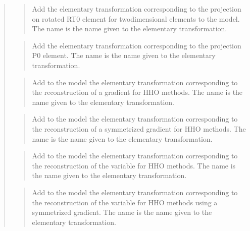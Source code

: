 \documentclass[a4paper,11pt,english]{sphinxmanual}
\begin{document}
\begin{quote}
\begin{quote}
Add the elementary transformation corresponding to the projection
on rotated RT0 element for two\sphinxhyphen{}dimensional elements to the model.
The name is the name given to the elementary transformation.
\end{quote}

\begin{quote}

Add the elementary transformation corresponding to the projection
P0 element.
The name is the name given to the elementary transformation.
\end{quote}

\begin{quote}

Add to the model the elementary transformation corresponding to the
reconstruction of a gradient for HHO methods.
The name is the name given to the elementary transformation.
\end{quote}

\begin{quote}

Add to the model the elementary transformation corresponding to the
reconstruction of a symmetrized gradient for HHO methods.
The name is the name given to the elementary transformation.
\end{quote}

\begin{quote}

Add to the model the elementary transformation corresponding to the
reconstruction of the variable for HHO methods.
The name is the name given to the elementary transformation.
\end{quote}

\begin{quote}

Add to the model the elementary transformation corresponding to the
reconstruction of the variable for HHO methods using a symmetrized
gradient.
The name is the name given to the elementary transformation.
\end{quote}


\end{quote}
\end{document}
